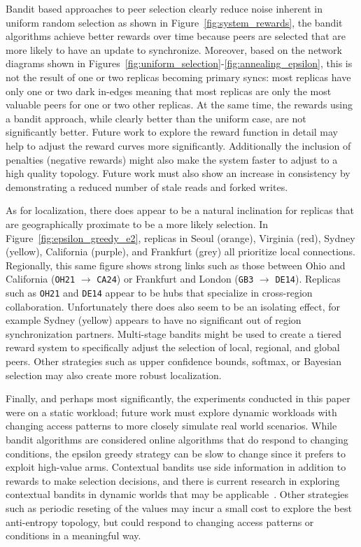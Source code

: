 Bandit based approaches to peer selection clearly reduce noise inherent
in uniform random selection as shown in Figure~\ref{fig:system_rewards},
the bandit algorithms achieve better rewards over time because peers
are selected that are more likely to have an update to synchronize.
Moreover, based on the network diagrams shown in
Figures~\ref{fig:uniform_selection}-\ref{fig:annealing_epsilon}, this is
not the result of one or two replicas becoming primary syncs: most
replicas have only one or two dark in-edges meaning that most replicas
are only the most valuable peers for one or two other replicas.
At the same time, the rewards using a bandit approach, while clearly better
than the uniform case, are not significantly better.
Future work to explore the reward function in detail may help to adjust
the reward curves more significantly.
Additionally the inclusion of penalties (negative rewards) might also make
the system faster to adjust to a high quality topology.
Future work must also show an increase in consistency by demonstrating a
reduced number of stale reads and forked writes.

As for localization, there does appear to be a natural inclination for
replicas that are geographically proximate to be a more likely selection.
In Figure~\ref{fig:epsilon_greedy_e2}, replicas in Seoul (orange), Virginia
(red), Sydney (yellow), California (purple), and Frankfurt (grey) all
prioritize local connections.
Regionally, this same figure shows strong links such as those between Ohio
and California (\texttt{OH21} $\rightarrow$ \texttt{CA24}) or Frankfurt and
London (\texttt{GB3} $\rightarrow$ \texttt{DE14}).
Replicas such as \texttt{OH21} and \texttt{DE14} appear to be hubs that
specialize in cross-region collaboration.
Unfortunately there does also seem to be an isolating effect, for example
Sydney (yellow) appears to have no significant out of region synchronization
partners.
Multi-stage bandits might be used to create a tiered reward system to
specifically adjust the selection of local, regional, and global peers.
Other strategies such as upper confidence bounds, softmax, or Bayesian
selection may also create more robust localization.

Finally, and perhaps most significantly, the experiments conducted in
this paper were on a static workload; future work must explore dynamic
workloads with changing access patterns to more closely simulate real
world scenarios.
While bandit algorithms are considered online algorithms that do respond
to changing conditions, the epsilon greedy strategy can be slow to change
since it prefers to exploit high-value arms.
Contextual bandits use side information in addition to rewards to make
selection decisions, and there is current research in exploring contextual
bandits in dynamic worlds that may be applicable~\cite{luo_efficient_2017}.
Other strategies such as periodic reseting of the values may incur a small
cost to explore the best anti-entropy topology, but could respond to changing
access patterns or conditions in a meaningful way.

